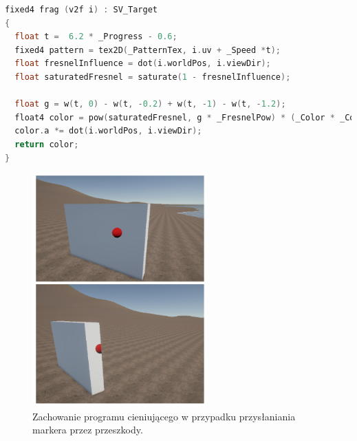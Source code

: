 \begin{lstlisting}[language=C++, caption=Fragment shadera odpowiedzialny za animację.]
fixed4 frag (v2f i) : SV_Target
{
  float t =  6.2 * _Progress - 0.6;
  fixed4 pattern = tex2D(_PatternTex, i.uv + _Speed *t);
  float fresnelInfluence = dot(i.worldPos, i.viewDir);
  float saturatedFresnel = saturate(1 - fresnelInfluence);

  float g = w(t, 0) - w(t, -0.2) + w(t, -1) - w(t, -1.2);
  float4 color = pow(saturatedFresnel, g * _FresnelPow) * (_Color * _ColorIntensity) * pattern;
  color.a *= dot(i.worldPos, i.viewDir);
  return color;
}
\end{lstlisting}

\begin{figure}[h]
\centering
\includegraphics[width=0.6\textwidth]{images/shader}
\caption{Zachowanie programu cieniującego w przypadku przysłaniania markera przez przeszkody.}
\end{figure}
